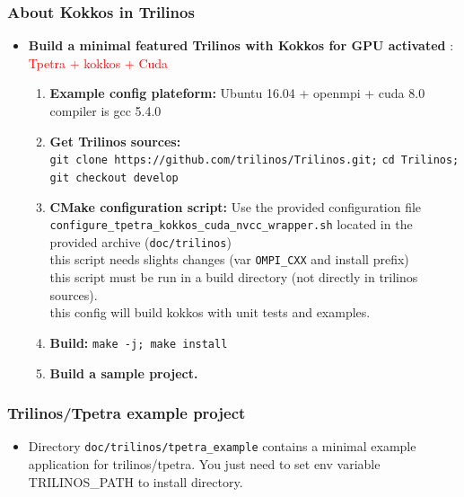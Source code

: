 \begin{frame}
  \frametitle{About Kokkos in Trilinos}

  \begin{itemize}
  \item \textbf{Build a minimal featured Trilinos with Kokkos for GPU activated} : \textcolor{red}{Tpetra + kokkos + Cuda}
    \begin{enumerate}
    \item \textbf{Example config plateform:} Ubuntu 16.04 + openmpi + cuda 8.0\\
      compiler is gcc 5.4.0
    \item \textbf{Get Trilinos sources:}\\
      \texttt{git clone https://github.com/trilinos/Trilinos.git;} \texttt{cd Trilinos; git checkout develop}
    \item \textbf{CMake configuration script:} Use the provided configuration file \texttt{configure\_tpetra\_kokkos\_cuda\_nvcc\_wrapper.sh} located in the provided archive (\texttt{doc/trilinos})\\
      this script needs slights changes (var \texttt{OMPI\_CXX} and install prefix)\\
      this script must be run in a build directory (not directly in trilinos sources).\\
      this config will build kokkos with unit tests and examples.
    \item \textbf{Build:} \texttt{make -j; make install}
    \item \textbf{Build a sample project.}
    \end{enumerate}
  \end{itemize}

\end{frame}

\begin{frame}
  \frametitle{Trilinos/Tpetra example project}

  \begin{itemize}
  \item Directory \texttt{doc/trilinos/tpetra\_example} contains a minimal example application for trilinos/tpetra. You just need to set env variable TRILINOS_PATH to install directory.
  \end{itemize}
  
\end{frame}
